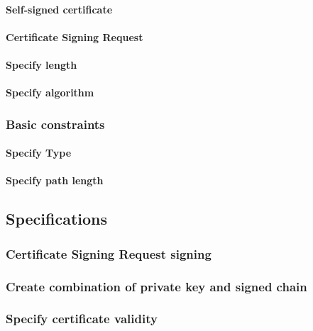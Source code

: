 \documentclass[10pt, a4paper]{report}
\begin{document}
      \paragraph{Self-signed certificate}
      
      \paragraph{Certificate Signing Request}
      
      \paragraph{Specify length}
      
      \paragraph{Specify algorithm}
      
    \subsubsection{Basic constraints}
    
      \paragraph{Specify Type}
      
      \paragraph{Specify path length}
      
  \subsection{Specifications}
  
    \subsubsection{Certificate Signing Request signing}
    
    \subsubsection{Create combination of private key and signed chain}
    
    \subsubsection{Specify certificate validity}
    
\end{document}
